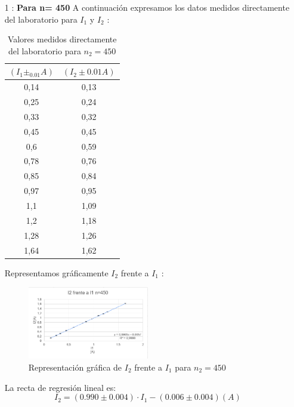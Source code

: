 \documentclass[11pt,letterpaper,twocolumn]{article}
\begin{document}
		\begin{itemize}
			\item[1]: \textbf{Para n= 450} 
				A continuación expresamos los datos medidos directamente del laboratorio para $I_1$ y $I_2$ :
				\begin{table}[H]
					\centering
					\caption{Valores medidos directamente del laboratorio para $n_2=450$}
					\begin{tabular}{|c|c|}
						\hline
						$\left( I_1\pm_0.01 A \right) $ & $\left( I_2 \pm 0.01 A \right) $ \\ \hline
						0,14 & 0,13 \\
						0,25 & 0,24 \\
						0,33 & 0,32 \\
						0,45 & 0,45 \\
						0,6 & 0,59 \\ 
						0,78 & 0,76 \\
						0,85 & 0,84 \\ 
						0,97 & 0,95 \\ 
						1,1 & 1,09 \\ 
						1,2 & 1,18 \\ 
						1,28 & 1,26 \\
						1,64 & 1,62 \\ \hline
					\end{tabular}
					\label{}
				\end{table}
		 Representamos gráficamente $I_2$ frente a $I_1$ :
		 \vfill  \hfill
		 \begin{figure}[H]
		 	\centering
		 	\includegraphics[width=0.5\textwidth]{In=4502.png}
			\caption{Representación gráfica de $I_2$ frente a $I_1$ para $n_2=450$}
		 	\label{fig:In-4502-png}
		 \end{figure}
		La recta de regresión lineal es:
		\begin{equation}
			\boxed{I_2={\left( 0.990 \pm 0.004 \right) \cdot I_1 - (0.006 \pm 0.004) } \left( A \right)  }
		\end{equation}
		

\end{itemize}
\end{document}
